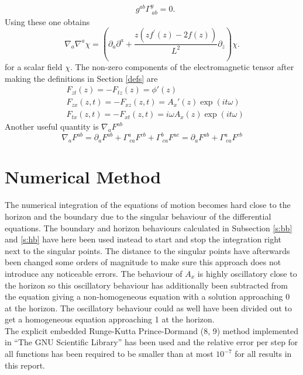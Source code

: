 \documentclass[12pt]{report}
\renewcommand{\i}{\ensuremath{i}}
\newcommand{\At}{\ensuremath{{\phi}}}
\begin{document}
\begin{appendices}
\begin{equation}
\begin{split}
&g^{ab}\Gamma^y_{\ ab}=0.
\end{split}\label{CSsum}
\end{equation}
Using these one obtains
\begin{equation}
 \nabla_a\nabla^a\chi=\left(\partial_a\partial^a+\frac{z \left(z f^\prime\left(z\right) - 2 f\left(z\right)\right)}{L^{2}}\partial_z\right)\chi.
\end{equation}
for a scalar field $\chi$.
The non-zero components of the electromagnetic tensor after making the definitions in Section \ref{defs} are
\begin{equation}
\begin{split}
 &F_{zt}(z)=-F_{tz}(z)=\At'(z)\\
 &F_{zx}(z,t)=-F_{xz}(z,t)=A_x'(z)\exp(\i t \omega)\\
 &F_{tx}(z,t)=-F_{xt}(z,t)=\i\omega A_x(z)\exp(\i t \omega)
\end{split}
\end{equation}
Another useful quantity is
$\nabla_aF^{ab}$
\begin{equation}
 \nabla_aF^{ab}=\partial_aF^{ab}+\Gamma^a_{\ ca}F^{cb}+\Gamma^b_{\ ca}F^{ac}=\partial_aF^{ab}+\Gamma^a_{\ ca}F^{cb}
\end{equation}
\chapter{Numerical Method\label{a:num}}
The numerical integration of the equations of motion becomes hard close to the horizon and the boundary due to the singular behaviour of the differential equations. The boundary and horizon behaviours calculated in Subsection \ref{s:bb} and \ref{s:hb} have here been used instead to start and stop the integration right next to the singular points. The distance to the singular points have afterwards been changed some orders of magnitude to make sure this approach does not introduce any noticeable errors. The behaviour of $A_x$ is highly oscillatory close to the horizon so this oscillatory behaviour has additionally been subtracted from the equation giving a non-homogeneous equation with a solution approaching 0 at the horizon. The oscillatory behaviour could as well have been divided out to get a homogeneous equation approaching 1 at the horizon.\\

The explicit embedded Runge-Kutta Prince-Dormand (8, 9) method implemented in ``The GNU Scientific Library'' \cite{gsl} has been used and the relative error per step for all functions has been required to be smaller than at most $10^{-7}$ for all results in this report.

\end{appendices}
\end{document}
